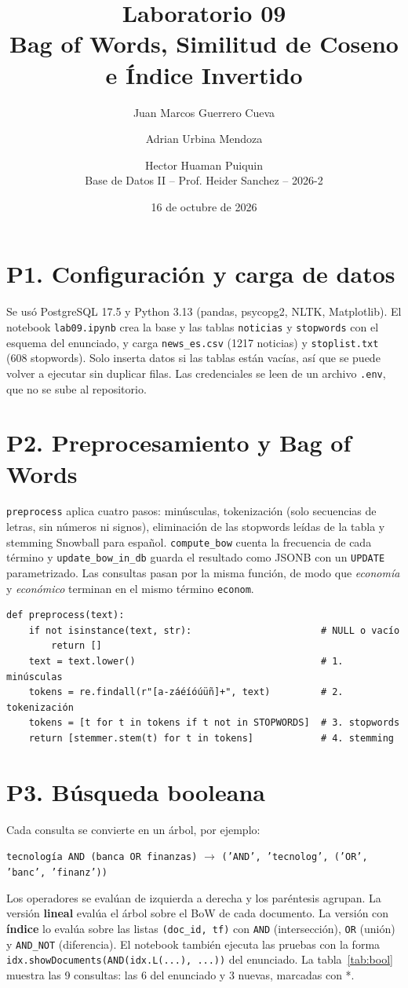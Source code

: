 \documentclass[11pt,a4paper]{article}
\title{Laboratorio 09\\[2pt]\large Bag of Words, Similitud de Coseno e Índice Invertido}
\author{Juan Marcos Guerrero Cueva \and Adrian Urbina Mendoza \and Hector Huaman Puiquin\\[6pt]
\small Base de Datos II -- Prof. Heider Sanchez -- 2026-2}
\date{16 de octubre de 2026}
\newcommand{\code}[1]{\texttt{#1}}
\begin{document}
\maketitle
\tableofcontents

\section{P1. Configuración y carga de datos}
Se usó PostgreSQL 17.5 y Python 3.13 (pandas, psycopg2, NLTK, Matplotlib). El notebook
\code{lab09.ipynb} crea la base y las tablas \code{noticias} y \code{stopwords} con el esquema
del enunciado, y carga \code{news\_es.csv} (1217 noticias) y \code{stoplist.txt} (608 stopwords).
Solo inserta datos si las tablas están vacías, así que se puede volver a ejecutar sin duplicar filas.
Las credenciales se leen de un archivo \code{.env}, que no se sube al repositorio.

\section{P2. Preprocesamiento y Bag of Words}
\code{preprocess} aplica cuatro pasos: minúsculas, tokenización (solo secuencias de letras, sin
números ni signos), eliminación de las stopwords leídas de la tabla y stemming Snowball para
español. \code{compute\_bow} cuenta la frecuencia de cada término y \code{update\_bow\_in\_db}
guarda el resultado como JSONB con un \code{UPDATE} parametrizado. Las consultas pasan por la misma
función, de modo que \emph{economía} y \emph{económico} terminan en el mismo término \code{econom}.
\begin{lstlisting}
def preprocess(text):
    if not isinstance(text, str):                       # NULL o vacío
        return []
    text = text.lower()                                 # 1. minúsculas
    tokens = re.findall(r"[a-záéíóúüñ]+", text)         # 2. tokenización
    tokens = [t for t in tokens if t not in STOPWORDS]  # 3. stopwords
    return [stemmer.stem(t) for t in tokens]            # 4. stemming
\end{lstlisting}

\section{P3. Búsqueda booleana}
Cada consulta se convierte en un árbol, por ejemplo:
\begin{center}\code{tecnología AND (banca OR finanzas)} $\rightarrow$ \code{('AND', 'tecnolog', ('OR', 'banc', 'finanz'))}\end{center}
Los operadores se evalúan de izquierda a derecha y los paréntesis agrupan.
La versión \textbf{lineal} evalúa el árbol sobre el BoW de cada documento. La versión con
\textbf{índice} lo evalúa sobre las listas \code{(doc\_id, tf)} con \code{AND} (intersección),
\code{OR} (unión) y \code{AND\_NOT} (diferencia). El notebook también ejecuta las pruebas con la forma
\code{idx.showDocuments(AND(idx.L(...), ...))} del enunciado. La tabla~\ref{tab:bool} muestra las
9 consultas: las 6 del enunciado y 3 nuevas, marcadas con *.
\end{document}
